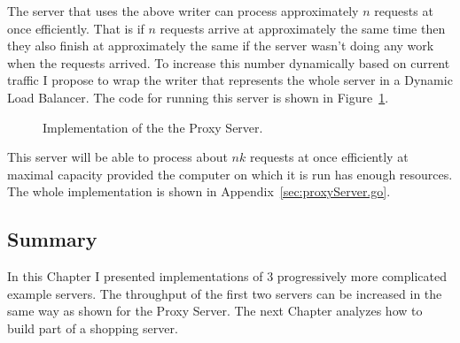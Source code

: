 \newpage
The server that uses the above writer can process approximately $n$ requests
at once efficiently. That is if $n$ requests arrive at approximately the same
time then they also finish at approximately the same if the server wasn't
doing any work when the requests arrived.
To increase this number dynamically based on current traffic I propose
to wrap the writer that represents the whole server in a Dynamic Load
Balancer. The code for running this server is shown in 
Figure~\ref{fig:ProxyServerImpl}.
\begin{figure}[h]
 
\caption[scale=1.0]{Implementation of the the Proxy Server.}
\label{fig:ProxyServerImpl}
\end{figure}

This server will be able to process about $n k$ requests at once efficiently
at maximal capacity provided the computer on which it is run has enough resources.
The whole implementation is shown in Appendix~\ref{sec:proxyServer.go}.

\subsection{Summary}
In this Chapter I presented implementations of 3 progressively more 
complicated example servers. The throughput of the first two servers
can be increased in the same way as shown for the Proxy Server. The 
next Chapter analyzes how to build part of a shopping server.
